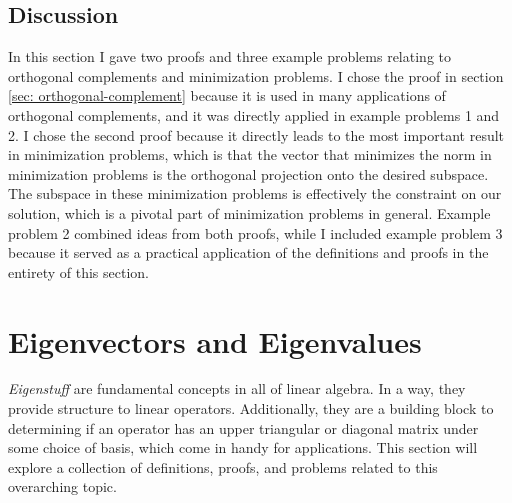 \documentclass{article}
\theoremstyle{definition}
\begin{document}
\subsection{Discussion}

In this section I gave two proofs and three example problems relating to orthogonal complements and minimization problems. I chose the proof in section \ref{sec: orthogonal-complement} because it is used in many applications of orthogonal complements, and it was directly applied in example problems 1 and 2. I chose the second proof because it directly leads to the most important result in minimization problems, which is that the vector that minimizes the norm in minimization problems is the orthogonal projection onto the desired subspace. The subspace in these minimization problems is effectively the constraint on our solution, which is a pivotal part of minimization problems in general. Example problem 2 combined ideas from both proofs, while I included example problem 3 because it served as a practical application of the definitions and proofs in the entirety of this section.

\section{Eigenvectors and Eigenvalues}
\label{sec: eigenstuff}

\textit{Eigenstuff} are fundamental concepts in all of linear algebra. In a way, they provide structure to linear operators. Additionally, they are a building block to determining if an operator has an upper triangular or diagonal matrix under some choice of basis, which come in handy for applications. This section will explore a collection of definitions, proofs, and problems related to this overarching topic.
\end{document}
